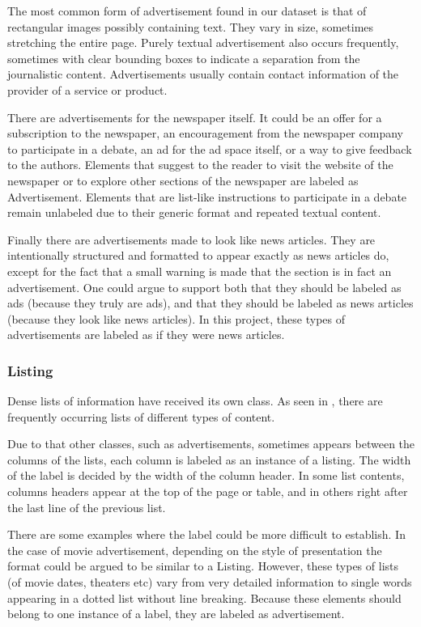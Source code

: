 \documentclass[oneside, english, bibtex]{kththesis}
\begin{document}
The most common form of advertisement found in our dataset is that of rectangular images possibly containing text.
They vary in size, sometimes stretching the entire page.
Purely textual advertisement also occurs frequently, sometimes with clear bounding boxes to indicate a separation from the journalistic content.
Advertisements usually contain contact information of the provider of a service or product.

There are advertisements for the newspaper itself.
It could be an offer for a subscription to the newspaper,
an encouragement from the newspaper company to participate in a debate, an ad for the ad space itself,
or a way to give feedback to the authors. Elements that suggest to the reader to visit the website of the newspaper
or to explore other sections of the newspaper are labeled as Advertisement.
Elements that are list-like instructions to participate in a debate remain unlabeled due to their generic format and repeated textual content.

Finally there are advertisements made to look like news articles.
They are intentionally structured and formatted to appear exactly as news articles do,
except for the fact that a small warning is made that the section is in fact an advertisement.
One could argue to support both that they should be labeled as ads (because they truly are ads), and that they should be labeled as news articles (because they look like news articles).
In this project, these types of advertisements are labeled as if they were news articles.

\subsubsection{Listing}

Dense lists of information have received its own class. As seen in ,
there are frequently occurring lists of different types of content.

Due to that other classes, such as advertisements, sometimes appears between the columns of the lists, each column is labeled as an instance of a listing.
The width of the label is decided by the width of the column header. In some list contents, columns headers appear at the top of the page or table,
and in others right after the last line of the previous list.

There are some examples where the label could be more difficult to establish.
In the case of movie advertisement, depending on the style of presentation the format could be argued to be similar to a Listing.
However, these types of lists (of movie dates, theaters etc) vary from very detailed information to single words appearing in a dotted list without line breaking.
Because these elements should belong to one instance of a label, they are labeled as advertisement.
\end{document}
